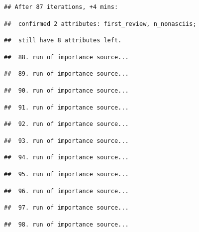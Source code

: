 \documentclass[
]{article}
\begin{document}
\begin{verbatim}
## After 87 iterations, +4 mins:
\end{verbatim}

\begin{verbatim}
##  confirmed 2 attributes: first_review, n_nonasciis;
\end{verbatim}

\begin{verbatim}
##  still have 8 attributes left.
\end{verbatim}

\begin{verbatim}
##  88. run of importance source...
\end{verbatim}

\begin{verbatim}
##  89. run of importance source...
\end{verbatim}

\begin{verbatim}
##  90. run of importance source...
\end{verbatim}

\begin{verbatim}
##  91. run of importance source...
\end{verbatim}

\begin{verbatim}
##  92. run of importance source...
\end{verbatim}

\begin{verbatim}
##  93. run of importance source...
\end{verbatim}

\begin{verbatim}
##  94. run of importance source...
\end{verbatim}

\begin{verbatim}
##  95. run of importance source...
\end{verbatim}

\begin{verbatim}
##  96. run of importance source...
\end{verbatim}

\begin{verbatim}
##  97. run of importance source...
\end{verbatim}

\begin{verbatim}
##  98. run of importance source...
\end{verbatim}
\end{document}
